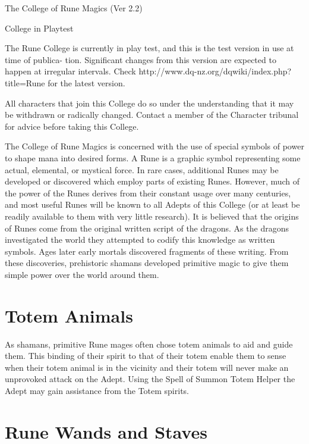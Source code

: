 \begin{Chapter}{The College of Rune Magics (Ver 2.2)}

College in Playtest 

The Rune College is currently in play test, and this is the test
version in use at time of publica- tion.  Significant changes from
this version are expected to happen at irregular intervals. Check
http://www.dq-nz.org/dqwiki/index.php?title=Rune for the latest
version.

All characters that join this College do so under the understanding
that it may be withdrawn or radically changed.  Contact a member of
the Character tribunal for advice before taking this College.

The College of Rune Magics is concerned with the 
use of special symbols of power to shape mana into 
desired  forms.  A  Rune  is  a  graphic  symbol  representing  some  actual,  elemental,  or  mystical  force. 
In  rare  cases,  additional  Runes  may  be  developed 
or  discovered  which  employ  parts  of  existing 
Runes. However, much of the power of the Runes 
derives from their constant usage over many centuries,  and  most  useful  Runes  will  be  known  to  all 
Adepts of this College (or at least be readily available to them with very little research). It is believed 
that  the  origins  of  Runes  come  from  the  original 
written script of the dragons. As the dragons investigated  the  world  they  attempted  to  codify  this 
knowledge  as  written  symbols.  Ages  later  early 
mortals  discovered  fragments  of  these  writing. 
From these discoveries, prehistoric shamans developed  primitive  magic  to  give  them  simple  power 
over the world around them. 


\section{Totem Animals}

As shamans, primitive Rune mages often chose totem animals to aid and
guide them. This binding of their spirit to that of their totem enable
them to sense when their totem animal is in the vicinity and their
totem will never make an unprovoked attack on the Adept.  Using the
Spell of Summon Totem Helper the Adept may gain assistance from the
Totem spirits.


\section{Rune Wands and Staves}


\end{Chapter}
